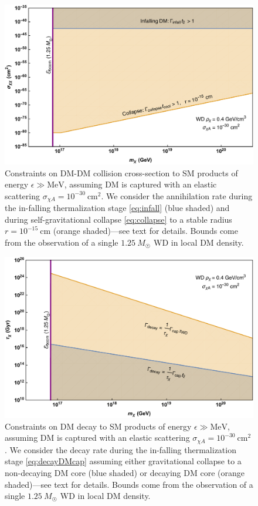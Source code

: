 \documentclass[preprintnumbers,amsmath,amssymb,prd,superscriptaddress]{revtex4}
\newcommand{\MeV}{\text{MeV}}
\newcommand{\cm}{\text{cm}}
\begin{document}
\begin{figure}
\includegraphics[scale=.35]{capturecollision.pdf}
\caption{Constraints on DM-DM collision cross-section to SM products of energy $\epsilon \gg \MeV$, assuming DM is captured with an elastic scattering $\sigma_{\chi A} = 10^{-30} ~\cm^2$.
We consider the annihilation rate during the in-falling thermalization stage \eqref{eq:infall} (blue shaded) and during self-gravitational collapse \eqref{eq:collapse} to a stable radius $r = 10^{-15} ~\cm$ (orange shaded)---see text for details.
Bounds come from the observation of a single $1.25~M_{\astrosun}$ WD in local DM density.
}
\label{fig:capture-collision}
\end{figure}

\begin{figure}
\includegraphics[scale=.35]{capturedecay.pdf}
\caption{Constraints on DM decay to SM products of energy $\epsilon \gg \MeV$, assuming DM is captured with an elastic scattering $\sigma_{\chi A} = 10^{-30} ~\cm^2$.
We consider the decay rate during the in-falling thermalization stage \eqref{eq:decayDMcap} assuming either gravitational collapse to a non-decaying DM core (blue shaded) or decaying DM core (orange shaded)---see text for details.
Bounds come from the observation of a single $1.25~M_{\astrosun}$ WD in local DM density.}
\label{fig:capture-decay}
\end{figure}
\end{document}
